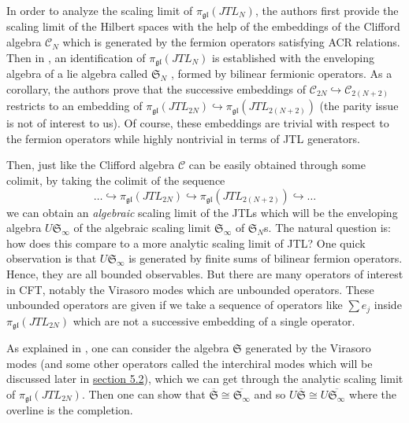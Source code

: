 \documentclass[twoside,11pt,titlepage]{amsart}
\renewcommand{\=}[1]{\stackrel{#1}{=}} %
\theoremstyle{definition}
\theoremstyle{remark}
\begin{document}
In order to analyze the scaling limit of $\pi_{\mathfrak{gl}}(JTL_N)$, the authors first provide the scaling limit of the Hilbert spaces with the help of the embeddings of the Clifford algebra $\mathcal{C}_N$ \cite[(C4)]{gainutdinov2016associative} which is generated by the fermion operators satisfying ACR relations. Then in \cite[Theorem 4.4]{gainutdinov2016associative}, an identification of $\pi_{\mathfrak{gl}}(JTL_N)$ is established with the enveloping algebra of a lie algebra called $\mathfrak{S}_N$ \cite[(4.10)]{gainutdinov2016associative}, formed by bilinear fermionic operators. As a corollary, the authors prove that the successive embeddings of $\mathcal{C}_{2N}\hookrightarrow \mathcal{C}_{2(N+2)}$ restricts to an embedding of $\pi_{\mathfrak{gl}}(JTL_{2N})\hookrightarrow \pi_{\mathfrak{gl}}(JTL_{2(N+2)})$ (the parity issue is not of interest to us). Of course, these embeddings are trivial with respect to the fermion operators while highly nontrivial in terms of JTL generators. 

Then, just like the Clifford algebra $\mathcal{C}$ can be easily obtained through some colimit, by taking the colimit of the sequence 
$$\ldots\hookrightarrow\pi_{\mathfrak{gl}}(JTL_{2N})\hookrightarrow \pi_{\mathfrak{gl}}(JTL_{2(N+2)})\hookrightarrow \ldots$$
we can obtain an \textit{algebraic} scaling limit of the JTLs which will be the enveloping algebra $U\mathfrak{S}_\infty$ of the algebraic scaling limit $\mathfrak{S}_\infty$ of $\mathfrak{S}_N$s. The natural question is: how does this compare to a more analytic scaling limit of JTL? One quick observation is that $U\mathfrak{S}_\infty$ is generated by finite sums of bilinear fermion operators. Hence, they are all bounded observables. But there are many operators of interest in CFT, notably the Virasoro modes which are unbounded operators. These unbounded operators are given if we take a sequence of operators like $\sum e_j$ inside $\pi_{\mathfrak{gl}}(JTL_{2N})$ which are not a successive embedding of a single operator.

As explained in \cite[section 6]{gainutdinov2016associative}, one can consider the algebra $\mathfrak{S}$ generated by the Virasoro modes (and some other operators called the interchiral modes which will be discussed later in \hyperref[5.2]{section 5.2}), which we can get through the analytic scaling limit of $\pi_{\mathfrak{gl}}(JTL_{2N})$. Then one can show that $\overline{\mathfrak{S}}\cong \overline{\mathfrak{S}_\infty}$ and so $U\overline{\mathfrak{S}}\cong U\overline{\mathfrak{S}_\infty}$ where the overline is the completion. 
\end{document}
